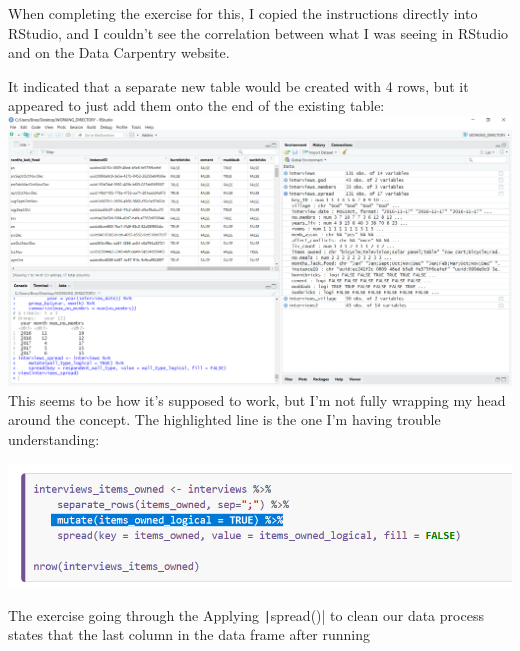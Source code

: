 \documentclass{article}
\begin{document}
{\item When completing the exercise for this, I copied the instructions directly into RStudio, and I couldn’t see the correlation between what I was seeing in RStudio and on the Data Carpentry website.
\item It indicated that a separate new table would be created with 4 rows, but it appeared to just add them onto the end of the existing table:
\includegraphics[width=1.0\textwidth]{rstudio_22.PNG}
This seems to be how it’s supposed to work, but I’m not fully wrapping my head around the concept. The highlighted line is the one I’m having trouble understanding:

\includegraphics[width=1.0\textwidth]{rstudio_23.PNG}}

{\item The exercise going through the Applying \texttt|spread()| to clean our data process states that the last column in the data frame after running }
\end{document}
